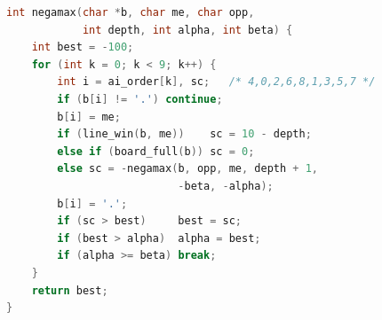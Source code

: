 \begin{lstlisting}[float=tp, language=C, caption={AI search (\texttt{main.c}, trimmed).}, label=lst:ai]
int negamax(char *b, char me, char opp,
            int depth, int alpha, int beta) {
    int best = -100;
    for (int k = 0; k < 9; k++) {
        int i = ai_order[k], sc;   /* 4,0,2,6,8,1,3,5,7 */
        if (b[i] != '.') continue;
        b[i] = me;
        if (line_win(b, me))    sc = 10 - depth;
        else if (board_full(b)) sc = 0;
        else sc = -negamax(b, opp, me, depth + 1,
                           -beta, -alpha);
        b[i] = '.';
        if (sc > best)     best = sc;
        if (best > alpha)  alpha = best;
        if (alpha >= beta) break;
    }
    return best;
}
\end{lstlisting}

